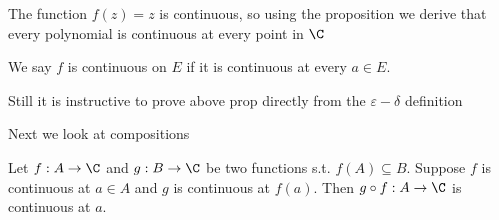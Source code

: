 \begin{example}
The function $f(z)=z$ is continuous, so using the proposition we derive that every polynomial is continuous at every point in $\C$
\end{example}
\begin{note}
We say $f$ is continuous on $E$ if it is continuous at every $a\in E$.
\end{note}
\begin{remark}
Still it is instructive to prove above prop directly from the $\varepsilon- \delta $ definition
\end{remark}
\begin{normal}
Next we look at compositions
\end{normal}
\begin{theorem}
Let $f:A\to \C $ and $g:B\to \C$ be two functions s.t. $f(A)\subseteq B$. Suppose $f$ is continuous at $a\in A$ and $g$ is continuous at $f(a)$. Then $g\circ f: A \to \C$ is continuous at $a$.\\




\begin{tikzpicture}[x=0.75pt,y=0.75pt,yscale=-1,xscale=1]


\end{tikzpicture}
\end{theorem}
